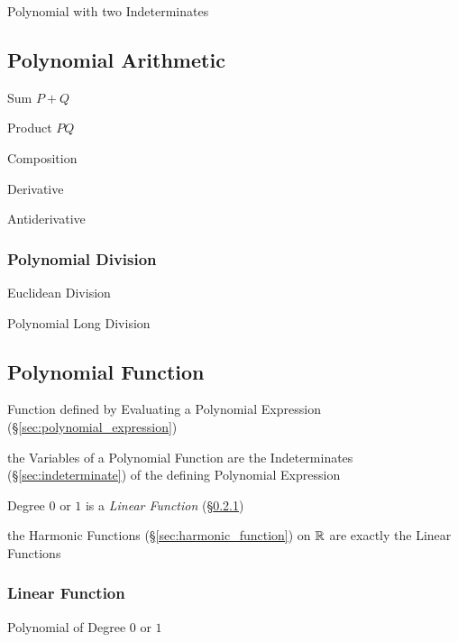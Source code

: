 Polynomial with two Indeterminates



\subsection{Polynomial Arithmetic}\label{sec:polynomial_arithmetic}

Sum $P + Q$

Product $P Q$

Composition

Derivative

Antiderivative



\subsubsection{Polynomial Division}\label{sec:polynomial_division}

Euclidean Division

Polynomial Long Division



\subsection{Polynomial Function}\label{sec:polynomial_function}

Function defined by Evaluating a Polynomial Expression
(\S\ref{sec:polynomial_expression})

the Variables of a Polynomial Function are the Indeterminates
(\S\ref{sec:indeterminate}) of the defining Polynomial Expression

Degree $0$ or $1$ is a \emph{Linear Function} (\S\ref{sec:linear_function})

the Harmonic Functions (\S\ref{sec:harmonic_function}) on $\mathbb{R}$ are
exactly the Linear Functions



\subsubsection{Linear Function}\label{sec:linear_function}

Polynomial of Degree $0$ or $1$




